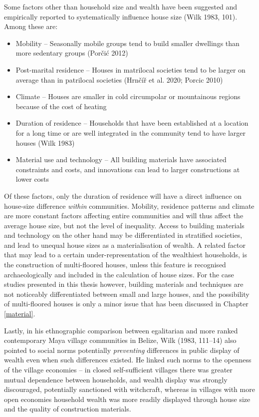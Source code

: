 \documentclass[
  12pt,
  a4paper, twoside]{book}
\begin{document}
Some factors other than household size and wealth have been suggested and empirically reported to systematically influence house size (Wilk 1983, 101). Among these are:

\begin{itemize}
\item
  Mobility -- Seasonally mobile groups tend to build smaller dwellings than more sedentary groups (Porčić 2012)
\item
  Post-marital residence -- Houses in matrilocal societies tend to be larger on average than in patrilocal societies (Hrnčíř et al. 2020; Porcic 2010)
\item
  Climate -- Houses are smaller in cold circumpolar or mountainous regions because of the cost of heating
\item
  Duration of residence -- Households that have been established at a location for a long time or are well integrated in the community tend to have larger houses (Wilk 1983)
\item
  Material use and technology -- All building materials have associated constraints and costs, and innovations can lead to larger constructions at lower costs
\end{itemize}

Of these factors, only the duration of residence will have a direct influence on house-size difference \emph{within} communities. Mobility, residence patterns and climate are more constant factors affecting entire communities and will thus affect the average house size, but not the level of inequality. Access to building materials and technology on the other hand may be differentiated in stratified societies, and lead to unequal house sizes as a materialisation of wealth. A related factor that may lead to a certain under-representation of the wealthiest households, is the construction of multi-floored houses, unless this feature is recognised archaeologically and included in the calculation of house sizes. For the case studies presented in this thesis however, building materials and techniques are not noticeably differentiated between small and large houses, and the possibility of multi-floored houses is only a minor issue that has been discussed in Chapter \ref{material}.

Lastly, in his ethnographic comparison between egalitarian and more ranked contemporary Maya village communities in Belize, Wilk (1983, 111--14) also pointed to social norms potentially \emph{preventing} differences in public display of wealth even when such differences existed. He linked such norms to the openness of the village economies -- in closed self-sufficient villages there was greater mutual dependence between households, and wealth display was strongly discouraged, potentially sanctioned with witchcraft, whereas in villages with more open economies household wealth was more readily displayed through house size and the quality of construction materials.
\end{document}
